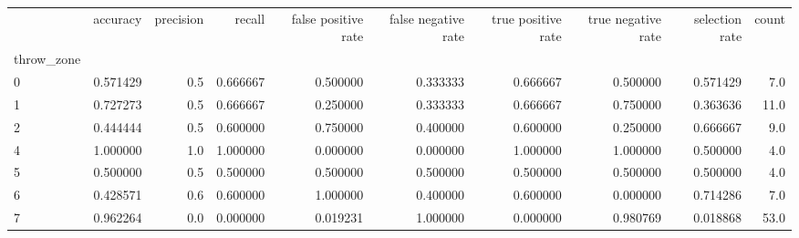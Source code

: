 \begin{tabular}{lrrrrrrrrr}
\toprule
{} &  accuracy &  precision &    recall &  false positive rate &  false negative rate &  true positive rate &  true negative rate &  selection rate &  count \\
throw\_zone &           &            &           &                      &                      &                     &                     &                 &        \\
\midrule
0          &  0.571429 &        0.5 &  0.666667 &             0.500000 &             0.333333 &            0.666667 &            0.500000 &        0.571429 &    7.0 \\
1          &  0.727273 &        0.5 &  0.666667 &             0.250000 &             0.333333 &            0.666667 &            0.750000 &        0.363636 &   11.0 \\
2          &  0.444444 &        0.5 &  0.600000 &             0.750000 &             0.400000 &            0.600000 &            0.250000 &        0.666667 &    9.0 \\
4          &  1.000000 &        1.0 &  1.000000 &             0.000000 &             0.000000 &            1.000000 &            1.000000 &        0.500000 &    4.0 \\
5          &  0.500000 &        0.5 &  0.500000 &             0.500000 &             0.500000 &            0.500000 &            0.500000 &        0.500000 &    4.0 \\
6          &  0.428571 &        0.6 &  0.600000 &             1.000000 &             0.400000 &            0.600000 &            0.000000 &        0.714286 &    7.0 \\
7          &  0.962264 &        0.0 &  0.000000 &             0.019231 &             1.000000 &            0.000000 &            0.980769 &        0.018868 &   53.0 \\
\bottomrule
\end{tabular}
